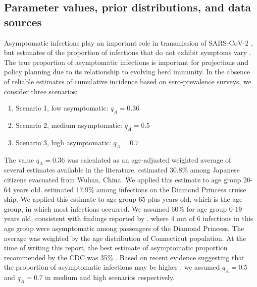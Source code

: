 \documentclass[11pt]{article}
\begin{document}


\subsection{Parameter values, prior distributions, and data sources}

Asymptomatic infections play an important role in transmission of SARS-CoV-2 \citep{furukawa2020evidence, liu2020contribution, emery2020contribution, he2020temporal}, but estimates of the proportion of infections that do not exhibit symptoms vary \citep{he2020estimation, nishiura2020estimation, mizumoto2020estimating, emery2020contribution, lavezzo2020suppression, campbell2020prevalence}. The true proportion of asymptomatic infections is important for projections and policy planning due to its relationship to evolving herd immunity. In the absence of reliable estimates of cumulative incidence based on sero-prevalence surveys, we consider three scenarios: 

\begin{enumerate}
	\item Scenario 1, low asymptomatic: $q_A = 0.36$
	\item Scenario 2, medium asymptomatic: $q_A = 0.5$
	\item Scenario 3, high asymptomatic: $q_A = 0.7$
\end{enumerate}

The value $q_A = 0.36$ was calculated as an age-adjusted weighted average of several estimates available in the literature.  
\citet{nishiura2020estimation} estimated 30.8\% among Japanese citizens evacuated from Wuhan, China. We applied this estimate to age group 20-64 years old.  
\citet{mizumoto2020estimating} estimated 17.9\% among infections on the Diamond Princess cruise ship. We applied this estimate to age group 65 plus years old, which is the age group, in which most infections occurred.
We assumed 60\% for age group 0-19 years old, consistent with findings reported by \citet{russell2020estimating}, where 4 out of 6 infections in this age group were asymptomatic among passengers of the Diamond Princess. 
The average was weighted by the age distribution of Connecticut population. 
At the time of writing this report, the best estimate of asymptomatic proportion recommended by the CDC was 35\% \citep{cdc2020scenarios}.
Based on recent evidence suggesting that the proportion of asymptomatic infections may be higher \citep{he2020estimation, emery2020contribution, kimball2020asymptomatic, lavezzo2020suppression, campbell2020prevalence, dingens2020seroprevalence}, we assumed $q_A = 0.5$ and $q_A = 0.7$ in medium and high scenarios respectively.  
\end{document}

